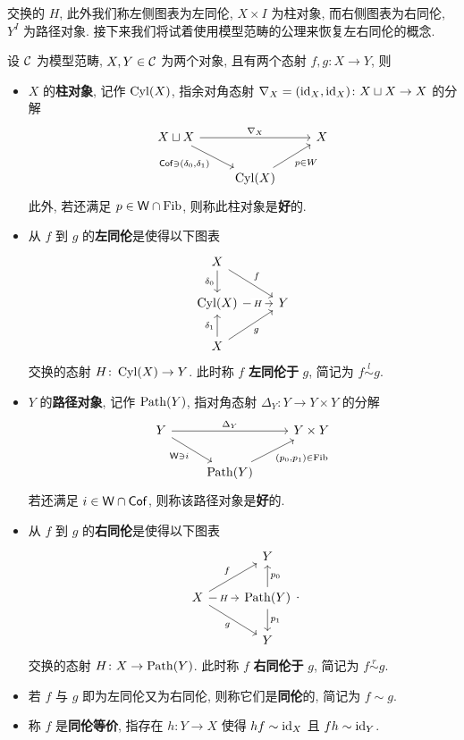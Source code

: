 交换的 $H$, 此外我们称左侧图表为左同伦, $X\times I$ 为柱对象, 而右侧图表为右同伦, $Y^{I}$ 为路径对象. 接下来我们将试着使用模型范畴的公理来恢复左右同伦的概念.
\begin{definition}[模型范畴的同伦]\label{定义:模型范畴中的同伦}
设 $\cal{C}$ 为模型范畴, $X,Y \in \cal{C}$ 为两个对象, 且有两个态射 $f,g \colon X \to Y$, 则
        \begin{itemize}
            \item $X$ 的\textbf{柱对象}, 记作 $\operatorname{Cyl}(X)$, 指余对角态射 $\nabla_X  =  (\mathrm{id}_X,\mathrm{id}_X) \colon X \sqcup X \to X$ 的分解
            \[\begin{tikzcd}
	{X\sqcup X} && X \\
	& {\Cyl(X)}
	\arrow["{\nabla_X}", from=1-1, to=1-3]
	\arrow["{\Cof \ni (\delta_0,\delta_1)}"', from=1-1, to=2-2]
	\arrow["{p\in W}"', from=2-2, to=1-3]
            \end{tikzcd}\]
            此外, 若还满足 $p\in \mathsf{W}\cap \operatorname{Fib}$, 则称此柱对象是\textbf{好}的.
            \item 从 $f$ 到 $g$ 的\textbf{左同伦}是使得以下图表
            \[\begin{tikzcd}
	X \\
	{\Cyl(X)} & Y \\
	X
	\arrow["{{\delta_0}}"', from=1-1, to=2-1]
	\arrow["f", from=1-1, to=2-2]
	\arrow["H"{description}, from=2-1, to=2-2]
	\arrow["{{\delta_1}}", from=3-1, to=2-1]
	\arrow["g"', from=3-1, to=2-2]
            \end{tikzcd}\]
            交换的态射 $H\colon \operatorname{Cyl}(X) \to Y$. 此时称 $f$ \textbf{左同伦于} $g$, 简记为 $f\overset{l}{\sim}g$.
            \item $Y$ 的\textbf{路径对象}, 记作 $\operatorname{Path}(Y)$, 指对角态射 $\Delta_Y \colon Y \to Y \times Y$ 的分解
            \[\begin{tikzcd}
	Y && {Y\times Y} \\
	& {\Path(Y)}
	\arrow["{\Delta_Y}", from=1-1, to=1-3]
	\arrow["{\cate{W}\ni i}"', from=1-1, to=2-2]
	\arrow["{(p_0,p_1)\in \Fib}"', from=2-2, to=1-3]
            \end{tikzcd}\]
            若还满足 $i\in \mathsf{W}\cap \mathsf{Cof}$, 则称该路径对象是\textbf{好}的.
            \item 从 $f$ 到 $g$ 的\textbf{右同伦}是使得以下图表
            \[\begin{tikzcd}
	& Y \\
	X & {\Path(Y)} \\
	& Y
	\arrow["f", from=2-1, to=1-2]
	\arrow["H"{description}, from=2-1, to=2-2]
	\arrow["g"', from=2-1, to=3-2]
	\arrow["{p_0}"', from=2-2, to=1-2]
	\arrow["{p_1}", from=2-2, to=3-2]
            \end{tikzcd}.\]
            交换的态射 $H\colon X \to \operatorname{Path}(Y)$. 此时称 $f$ \textbf{右同伦于} $g$, 简记为 $f\overset{r}{\sim}g$.
            \item 若 $f$ 与 $g$ 即为左同伦又为右同伦, 则称它们是\textbf{同伦}的, 简记为 $f\sim g$.
            \item 称 $f$ 是\textbf{同伦等价}, 指存在 $h \colon Y \to X$ 使得 $hf\sim \mathrm{id}_X$ 且 $fh \sim \mathrm{id}_Y$.
        \end{itemize}
\end{definition}
